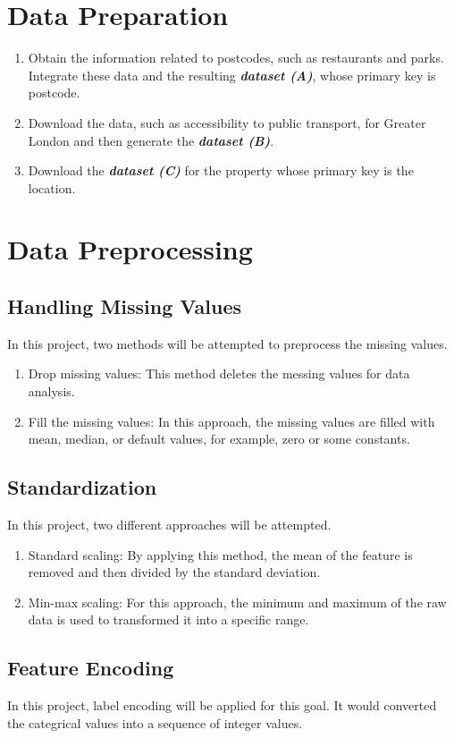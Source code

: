 \documentclass[12pt,twoside]{report}
\begin{document}
\section{Data Preparation}
\begin{enumerate}
	\item Obtain the information related to postcodes, such as restaurants and parks. Integrate these data and the resulting \textit{\textbf{dataset (A)}}, whose primary key is postcode. 
	\item Download the data, such as accessibility to public transport, for Greater London and then generate the \textit{\textbf{dataset (B)}}.
	\item Download the \textbf{\textit{dataset (C)}} for the property whose primary key is the location. 
\end{enumerate}

\section{Data Preprocessing}
\subsection{Handling Missing Values}
In this project, two methods will be attempted to preprocess the missing values.
\begin{enumerate}
	\item Drop missing values: This method deletes the messing values for data analysis.
	\item Fill the missing values: In this approach, the missing values are filled with mean, median, or default values, for example, zero or some constants.
\end{enumerate}

\subsection{Standardization}
In this project, two different approaches will be attempted. 
\begin{enumerate}
	\item Standard scaling: By applying this method, the mean of the feature is removed and then divided by the standard deviation. 
	\item Min-max scaling: For this approach, the minimum and maximum of the raw data is used to transformed it into a specific range.
\end{enumerate}

\subsection{Feature Encoding}
In this project, label encoding will be applied for this goal. It would converted the categrical values into a sequence of integer values. 
\end{document}
